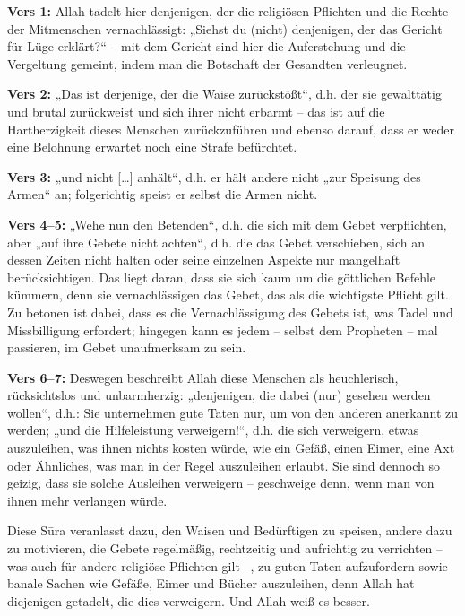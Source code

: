 \textbf{Vers 1:} Allah  tadelt hier denjenigen, der die religiösen Pflichten und die Rechte der
Mitmenschen vernachlässigt: „Siehst du (nicht) denjenigen, der das Gericht für Lüge erklärt?“ –
mit dem Gericht sind hier die Auferstehung und die Vergeltung gemeint, indem man die
Botschaft der Gesandten verleugnet.

\textbf{Vers 2:} „Das ist derjenige, der die Waise zurückstößt“, d.h. der sie gewalttätig und brutal
zurückweist und sich ihrer nicht erbarmt – das ist auf die Hartherzigkeit dieses Menschen
zurückzuführen und ebenso darauf, dass er weder eine Belohnung erwartet noch eine Strafe
befürchtet.

\textbf{Vers 3:} „und nicht […] anhält“, d.h. er hält andere nicht „zur Speisung des Armen“ an;
folgerichtig speist er selbst die Armen nicht.

\textbf{Vers 4–5:} „Wehe nun den Betenden“, d.h. die sich mit dem Gebet verpflichten, aber „auf
ihre Gebete nicht achten“, d.h. die das Gebet verschieben, sich an dessen Zeiten nicht halten
oder seine einzelnen Aspekte nur mangelhaft berücksichtigen. Das liegt daran, dass sie sich kaum
um die göttlichen Befehle kümmern, denn sie vernachlässigen das Gebet, das als die wichtigste
Pflicht gilt. Zu betonen ist dabei, dass es die Vernachlässigung des Gebets ist, was Tadel und
Missbilligung erfordert; hingegen kann es jedem – selbst dem Propheten  – mal passieren,
im Gebet unaufmerksam zu sein.

\textbf{Vers 6–7:} Deswegen beschreibt Allah diese Menschen als heuchlerisch, rücksichtslos und
unbarmherzig: „denjenigen, die dabei (nur) gesehen werden wollen“, d.h.: Sie unternehmen gute
Taten nur, um von den anderen anerkannt zu werden; „und die Hilfeleistung verweigern!“, d.h.
die sich verweigern, etwas auszuleihen, was ihnen nichts kosten würde, wie ein Gefäß, einen
Eimer, eine Axt oder Ähnliches, was man in der Regel auszuleihen erlaubt. Sie sind dennoch so
geizig, dass sie solche Ausleihen verweigern – geschweige denn, wenn man von ihnen mehr
verlangen würde.

\begin{merke}
Diese Sūra veranlasst dazu, den Waisen und Bedürftigen zu speisen, andere dazu zu motivieren,
die Gebete regelmäßig, rechtzeitig und aufrichtig zu verrichten – was auch für andere religiöse
Pflichten gilt –, zu guten Taten aufzufordern sowie banale Sachen wie Gefäße, Eimer und Bücher
auszuleihen, denn Allah hat diejenigen getadelt, die dies verweigern. Und Allah  weiß es
besser.
\end{merke}


